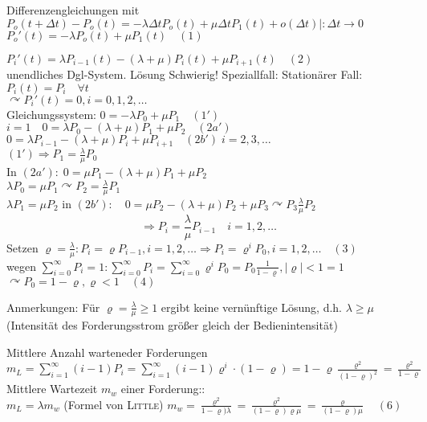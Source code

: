 \documentclass[a4paper]{scrartcl}
\begin{document}
Differenzengleichungen mit $P_o (t+ \Delta t) -  P_o(t) = - \lambda \Delta t P_o (t) + \mu \Delta t P_1 (t) + o (\Delta t) | : \Delta t \to 0$\\
$P_o' (t) = - \lambda P_o(t) + \mu P_1 (t) \quad (1)$

$P_i'(t) = \lambda P_{i-1} (t) - (\lambda + \mu ) P_i (t) + \mu P_{i+1} (t) \quad (2)$\\
unendliches Dgl-System. Lösung Schwierig! Speziallfall: Stationärer Fall: $P_i (t) =  P_i \quad \forall t$\\
$\curvearrowright P_i' (t) = 0, i = 0,1,2,\dots$\\
Gleichungssystem: $0 = - \lambda P_0 + \mu P_1 \quad (1')$\\
$i=1 \quad  0 = \lambda P_0 - (\lambda + \mu ) P_1 + \mu P_2 \quad (2a')$\\
$ 0 = \lambda P_{i-1} - (\lambda + \mu) P_i + \mu P_{i+1} \quad (2b') \; i=2,3,\dots$\\
$(1') \Rightarrow P_1 = \frac{\lambda}{\mu} P_0$\\
In $(2a'): \; 0 =  \mu P_1 - (\lambda + \mu ) P_1 + \mu P_2$\\
$\lambda P_0 = \mu P_1 \curvearrowright P_2 = \frac{\lambda}{\mu} P_1$\\
$\lambda P_1 = \mu P_2$ in $(2b') : \quad 0 = \mu P_2 - (\lambda + \mu ) P_2 + \mu P_3 \curvearrowright P_3 \frac{\lambda}{\mu} P_2$
\[ \Rightarrow P_i = \frac{\lambda}{\mu} P_{i-1} \quad i = 1,2,\dots\]
Setzen $\varrho = \frac{\lambda}{\mu} : P_i = \varrho P_{i-1}, i = 1,2,\dots \Rightarrow P_i = \varrho^i P_0, i = 1,2,\dots \quad (3)$\\
wegen $ \sum\limits_{i=0}^\infty P_i = 1 : \sum\limits_{i=0}^\infty P_i = \sum\limits_{i=0}^\infty \varrho^i P_0 = P_0 \frac{1}{1-\varrho}, | \varrho | < 1 = 1$\\
$\curvearrowright P_0 = 1 - \varrho, \varrho < 1 \quad (4)$

Anmerkungen: Für $\varrho = \frac{\lambda}{\mu} \geq 1$ ergibt keine vernünftige Lösung, d.h. $\lambda \geq \mu$ (Intensität des Forderungsstrom größer gleich der Bedienintensität)

Mittlere Anzahl warteneder Forderungen\\
$m_L = \sum\limits_{i=1}^\infty (i-1) P_i = \sum\limits_{i=1}^\infty (i-1) \varrho^i \cdot (1- \varrho) = 1- \varrho \frac{\varrho^2}{(1- \varrho)^2} = \frac{\varrho^2}{1-\varrho}$\\
Mittlere Wartezeit $m_w$ einer Forderung::\\
$m_L = \lambda m_w$ (Formel von \textsc{Little})
$m_w = \frac{\varrho^2}{1-\varrho)\lambda} = \frac{\varrho^2}{(1-\varrho)\varrho \mu}= \frac{\varrho}{(1-\varrho)\mu} \quad (6)$
\end{document}
